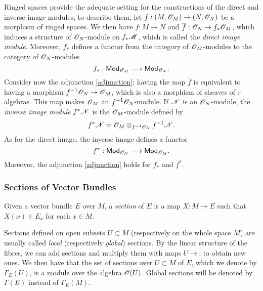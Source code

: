 Ringed spaces provide the adequate setting for the constructions of the direct and inverse image modules; to describe them, let $f:(M,\mathscr{O}_M)\to (N,\mathscr{O}_N)$ be a morphism of ringed spaces. We then have $f:M\to N$ and $\overline{f}:\mathscr{O}_N\to f_*\mathscr{O}_M$, which induces a structure of $\mathscr{O}_N$-module on $f_*\mathscr{M}$, which is called the \emph{direct image module}. Moreover, $f_*$ defines a functor from the category of $\mathscr{O}_M$-modules to the category of $\mathscr{O}_N$-modules
$$f_*:\mathsf{Mod}_{\mathscr{O}_M}\longrightarrow \mathsf{Mod}_{\mathscr{O}_N}.$$
Consider now the adjunction \ref{adjunction}; having the map $\overline{f}$ is equivalent to having a morphism $f^{-1}\mathscr{O}_N\to \mathscr{O}_M$, which is also a morphism of sheaves of $\comp$-algebras. This map makes $\mathscr{O}_M$ an $f^{-1}\mathscr{O}_N$-module. If $\mathscr{N}$ is an $\mathscr{O}_N$-module, the \emph{inverse image module} $f^*\mathscr{N}$ is the $\mathscr{O}_M$-module defined by
$$f^*\mathscr{N}=\mathscr{O}_M\otimes_{f^{-1}\mathscr{O}_N}f^{-1}\mathscr{N}.$$
As for the direct image, the inverse image defines a functor
$$f^*:\mathsf{Mod}_{\mathscr{O}_N}\longrightarrow \mathsf{Mod}_{\mathscr{O}_M}.$$
Moreover, the adjunction \ref{adjunction} holds for $f_*$ and $f^*$.


\subsubsection{Sections of Vector Bundles}

\begin{defi}
Given a vector bundle $E$ over $M$, a \emph{section} of $E$ is a map $X:M\to E$ such that $X(x)\in E_x$ for each $x\in M$.
\end{defi}

Sections defined on open subsets $U\subset M$ (respectively on the whole space $M$) are usually called \emph{local} (respectively \emph{global}) sections. By the linear structure of the fibres, we can add sections and multiply them with maps $U\to \comp$ to obtain new ones. We then have that the set of sections over $U\subset M$ of $E$, which we denote by $\Gamma_E(U)$, is a module over the algebra $\mathscr{O}(U)$. Global sections will be denoted by $\Gamma (E)$ instead of $\Gamma_E(M)$.

